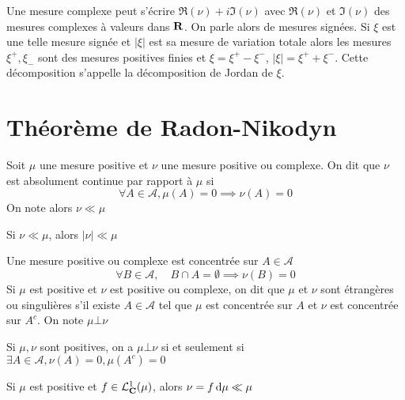 \begin{rem}
    Une mesure complexe peut s'écrire $\Re(\nu)+i\Im(\nu)$ avec $\Re(\nu)$ et $\Im(\nu)$ des mesures complexes à valeurs dans $ \mathbf R$. On parle alors de mesures signées. Si $\xi$ est une telle mesure signée et $|\xi|$ est sa mesure de variation totale alors les mesures $\xi^+, \xi_-$ sont des mesures positives finies et $\xi=\xi^+-\xi^-$, $|\xi|=\xi^++\xi^-$. Cette décomposition s'appelle la décomposition de Jordan de $\xi$.
\end{rem}

\section{Théorème de Radon-Nikodyn}

\begin{dfn}
    Soit $\mu$ une mesure positive et  $\nu$ une mesure positive ou complexe. On dit que  $\nu$ est absolument continue par rapport à  $\mu$ si  \[
        \forall  A \in  \mathcal  A, \mu(A)=0 \implies \nu(A)=0
    \] 
    On note alors $\nu \ll \mu$
\end{dfn}

\begin{rem}
Si $\nu \ll \mu$, alors  $|\nu|\ll\mu$
\end{rem}

\begin{dfn}
    Une mesure positive ou complexe est concentrée sur $A \in  \mathcal  A$ \[
        \forall  B \in  \mathcal A, \quad  B\cap A=\emptyset \implies \nu(B)=0
    \] 
    Si $\mu$ est positive et  $\nu$ est positive ou complexe, on dit que  $\mu$ et  $\nu$ sont étrangères ou singulières  s'il existe  $A \in  \mathcal  A$ tel que $\mu$ est concentrée sur  $A$ et  $\nu$ est concentrée sur  $A^c$. On note  $\mu\bot\nu$
\end{dfn}

\begin{rem}
    Si $\mu, \nu$ sont positives, on a $\mu\bot \nu$  si et seulement si $ \exists  A \in  \mathcal  A, \nu(A)=0, \mu(A^c)=0$
\end{rem}

\begin{ex}
    Si $\mu$ est positive et  $f \in  \mathcal  L^1_{\mathbf C}(\mu)$, alors $\nu=f\mathop{}\!\mathrm d \mu\ll\mu$
\end{ex}

